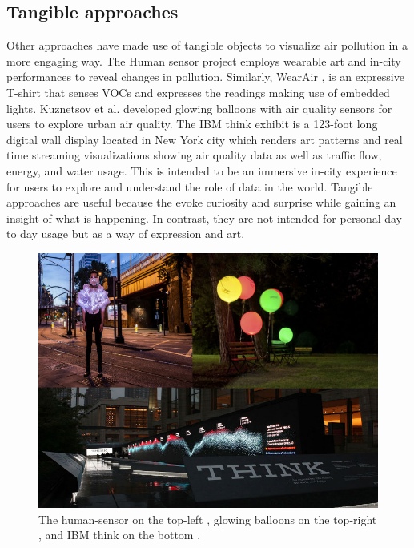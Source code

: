 \subsection{Tangible approaches}
Other approaches have made use of tangible objects to visualize air pollution in a more engaging way. The Human sensor project \cite{InvisibleDust2016} employs wearable art and in-city performances to reveal changes in pollution. Similarly, WearAir \cite{Kim2010}, is an expressive T-shirt that senses VOCs and expresses the readings making use of embedded lights. Kuznetsov et al. \cite{Kuznetsov2011} developed glowing balloons with air quality sensors for users to explore urban air quality. The IBM think exhibit \cite{IBM2012} is a 123-foot long digital wall display located in New York city which renders art patterns and real time streaming visualizations showing air quality data as well as traffic flow, energy, and water usage. This is intended to be an immersive in-city experience for users to explore and understand the role of data in the world. Tangible approaches are useful because the evoke curiosity and surprise while gaining an insight of what is happening. In contrast, they are not intended for personal day to day usage but as a way of expression and art. 

\begin{figure}[H]
\begin{adjustbox}{width=.8\textwidth,center=\textwidth}
  \centering
  \includegraphics[scale=.4]{images/think_human_sensor_balloons.jpg}
\end{adjustbox}
  \caption[Tangible visualizations]{The human-sensor on the top-left \cite{InvisibleDust2016}, glowing balloons on the top-right \cite{Kuznetsov2011}, and IBM think on the bottom \cite{IBM2012}.}
  \label{fig:photo_based_instaNO2}
\end{figure}

